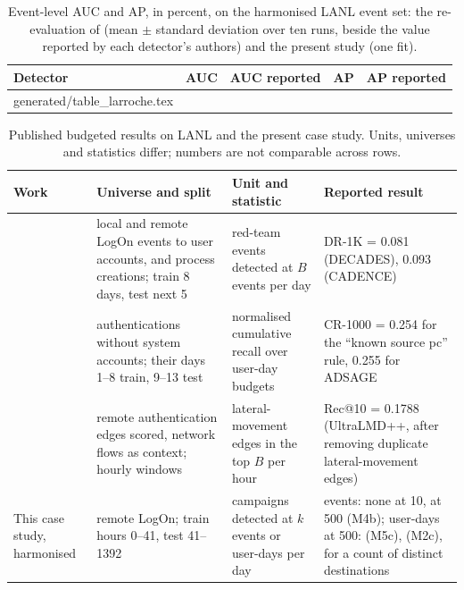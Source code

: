 \documentclass[11pt,a4paper]{article}
\makeatletter
\newcommand{\tablerows}[1]{\@@input #1 }
\makeatother
\begin{document}
\begin{table}[t]
\centering
\small
\begin{threeparttable}
\caption{Event-level AUC and AP, in percent, on the harmonised LANL event set: the re-evaluation of \textcite[Table~5]{larroche2026fair} (mean $\pm$ standard deviation over ten runs, beside the value reported by each detector's authors) and the present study (one fit).}
\label{tab:larroche}
\begin{tabular}{@{}lrrrr@{}}
\toprule
Detector & AUC & AUC reported & AP & AP reported \\
\midrule
\tablerows{generated/table_larroche.tex}
\bottomrule
\end{tabular}
\end{threeparttable}
\end{table}

\begin{table}[t]
\centering
\footnotesize
\begin{threeparttable}
\caption{Published budgeted results on LANL and the present case study. Units, universes and statistics differ; numbers are not comparable across rows.}
\label{tab:comparison}
\begin{tabular}{@{}L{3.1cm}L{4.1cm}L{2.2cm}L{4.5cm}@{}}
\toprule
Work & Universe and split & Unit and statistic & Reported result \\
\midrule
\textcite{larroche2021decades} & local and remote LogOn events to user accounts, and process creations; train 8 days, test next 5 & red-team events detected at $B$ events per day & DR-1K = 0.081 (DECADES), 0.093 (CADENCE) \\
\textcite{garchery2020adsage} & authentications without system accounts; their days 1--8 train, 9--13 test & normalised cumulative recall over user-day budgets & CR-1000 = 0.254 for the \enquote{known source pc} rule, 0.255 for ADSAGE \\
\textcite{larroche2025ultralmd} & remote authentication edges scored, network flows as context; hourly windows & lateral-movement edges in the top $B$ per hour & Rec@10 = 0.1788 (UltraLMD++, after removing duplicate lateral-movement edges) \\
This case study, harmonised & remote LogOn; train hours 0--41, test 41--1392 & campaigns detected at $k$ events or user-days per day & events: none at 10, \HarmVaeRecallFiveHundred{} at 500 (M4b); user-days at 500: \HarmEulerUserDayFiveHundred{} (M5c), \HarmSourceRarityUserDayFiveHundred{} (M2c), \HarmBaselineDstUserDayFiveHundred{} for a count of distinct destinations \\
\bottomrule
\end{tabular}
\end{threeparttable}
\end{table}
\end{document}
